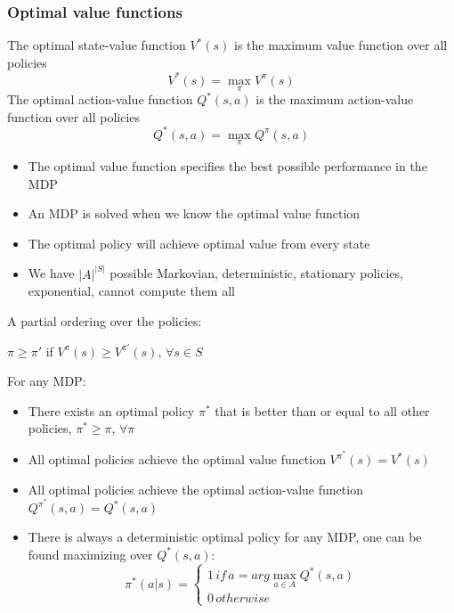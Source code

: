 \subsubsection{Optimal value functions}
    The optimal state-value function $V^*(s)$ is the maximum value function over all policies
    $$V^*(s)=\max_\pi V^\pi(s)$$
    The optimal action-value function $Q^*(s,a)$ is the maximum action-value function over all policies
    $$Q^*(s,a)=\max_\pi Q^\pi(s,a)$$
    \begin{itemize}
        \item The optimal value function specifies the best possible performance in the MDP
        \item An MDP is solved when we know the optimal value function
        \item The optimal policy will achieve optimal value from every state
        \item We have $|A|^{|S|}$ possible Markovian, deterministic, stationary policies, exponential, cannot compute them all
    \end{itemize}
    A partial ordering over the policies:
    \begin{center}
        $\pi \geq \pi'$ if $V^\pi(s) \geq V^{\pi'}(s)$, $\forall s \in S$        
    \end{center}
    For any MDP:
    \begin{itemize}
        \item There exists an optimal policy $\pi^*$ that is better than or equal to all other policies, $\pi^* \geq \pi$, $\forall \pi$
        \item All optimal policies achieve the optimal value function $V^{\pi^*}(s)=V^*(s)$
        \item All optimal policies achieve the optimal action-value function $Q^{\pi^*}(s,a)=Q^*(s,a)$
        \item There is always a deterministic optimal policy for any MDP, one can be found maximizing over $Q^*(s,a)$:
        $$
        \pi^*(a|s)=
            \begin{cases}
                1\,if\,a=arg \max_{a\in A}Q^*(s,a)\\
                0\,otherwise
            \end{cases}
        $$
    \end{itemize}
